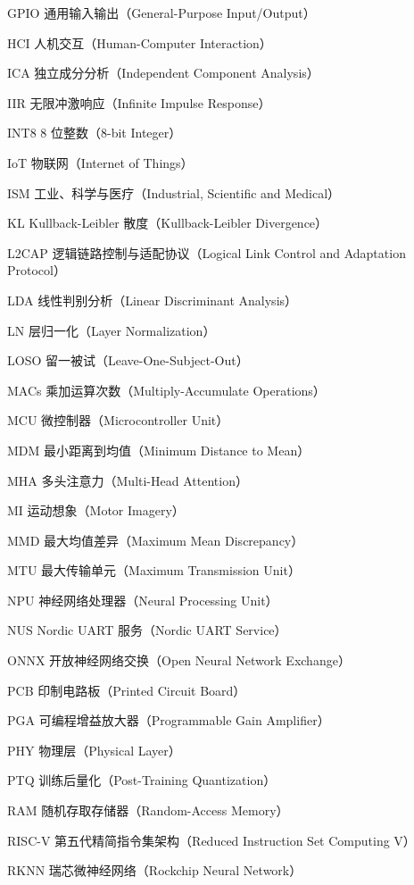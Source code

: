 \begin{denotation}
\item[GPIO] 通用输入输出（General-Purpose Input/Output）
\item[HCI] 人机交互（Human-Computer Interaction）
\item[ICA] 独立成分分析（Independent Component Analysis）
\item[IIR] 无限冲激响应（Infinite Impulse Response）
\item[INT8] 8 位整数（8-bit Integer）
\item[IoT] 物联网（Internet of Things）
\item[ISM] 工业、科学与医疗（Industrial, Scientific and Medical）
\item[KL] Kullback-Leibler 散度（Kullback-Leibler Divergence）
\item[L2CAP] 逻辑链路控制与适配协议（Logical Link Control and Adaptation Protocol）
\item[LDA] 线性判别分析（Linear Discriminant Analysis）
\item[LN] 层归一化（Layer Normalization）
\item[LOSO] 留一被试（Leave-One-Subject-Out）
\item[MACs] 乘加运算次数（Multiply-Accumulate Operations）
\item[MCU] 微控制器（Microcontroller Unit）
\item[MDM] 最小距离到均值（Minimum Distance to Mean）
\item[MHA] 多头注意力（Multi-Head Attention）
\item[MI] 运动想象（Motor Imagery）
\item[MMD] 最大均值差异（Maximum Mean Discrepancy）
\item[MTU] 最大传输单元（Maximum Transmission Unit）
\item[NPU] 神经网络处理器（Neural Processing Unit）
\item[NUS] Nordic UART 服务（Nordic UART Service）
\item[ONNX] 开放神经网络交换（Open Neural Network Exchange）
\item[PCB] 印制电路板（Printed Circuit Board）
\item[PGA] 可编程增益放大器（Programmable Gain Amplifier）
\item[PHY] 物理层（Physical Layer）
\item[PTQ] 训练后量化（Post-Training Quantization）
\item[RAM] 随机存取存储器（Random-Access Memory）
\item[RISC-V] 第五代精简指令集架构（Reduced Instruction Set Computing V）
\item[RKNN] 瑞芯微神经网络（Rockchip Neural Network）

\end{denotation}
